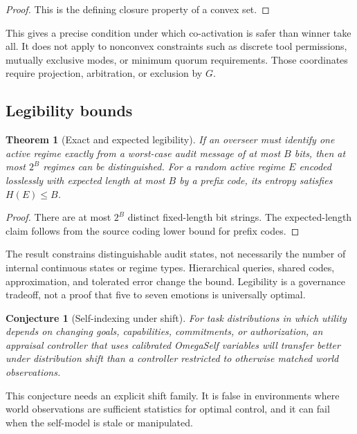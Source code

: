 \documentclass[11pt]{article}
\newtheorem{theorem}{Theorem}
\newtheorem{conjecture}{Conjecture}
\begin{document}
\begin{proof}
This is the defining closure property of a convex set.
\end{proof}

This gives a precise condition under which co-activation is safer than winner
take all.  It does not apply to nonconvex constraints such as discrete tool
permissions, mutually exclusive modes, or minimum quorum requirements.  Those
coordinates require projection, arbitration, or exclusion by $G$.

\subsection{Legibility bounds}

\begin{theorem}[Exact and expected legibility]
\label{thm:legibility}
If an overseer must identify one active regime exactly from a worst-case audit
message of at most $B$ bits, then at most $2^B$ regimes can be distinguished.
For a random active regime $E$ encoded losslessly with expected length at most
$B$ by a prefix code, its entropy satisfies $H(E)\le B$.
\end{theorem}

\begin{proof}
There are at most $2^B$ distinct fixed-length bit strings.  The expected-length
claim follows from the source coding lower bound for prefix codes.
\end{proof}

The result constrains distinguishable audit states, not necessarily the number
of internal continuous states or regime types.  Hierarchical queries, shared
codes, approximation, and tolerated error change the bound.  Legibility is a
governance tradeoff, not a proof that five to seven emotions is universally
optimal.

\begin{conjecture}[Self-indexing under shift]
\label{conj:self}
For task distributions in which utility depends on changing goals,
capabilities, commitments, or authorization, an appraisal controller that uses
calibrated OmegaSelf variables will transfer better under distribution shift
than a controller restricted to otherwise matched world observations.
\end{conjecture}

This conjecture needs an explicit shift family.  It is false in environments
where world observations are sufficient statistics for optimal control, and it
can fail when the self-model is stale or manipulated.
\end{document}
